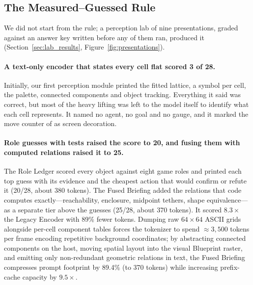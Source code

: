 \subsection{The Measured--Guessed Rule}
\label{sec:rule}

We did not start from the rule; a perception lab of nine presentations, graded against an answer key written before any of them ran, produced it (Section~\ref{sec:lab_results}, Figure~\ref{fig:presentations}).

\paragraph{A text-only encoder that states every cell flat scored 3 of 28.}
Initially, our first perception module printed the fitted lattice, a symbol per cell, the palette, connected components and object tracking. Everything it said was correct, but most of the heavy lifting was left to the model itself to identify what each cell represents. It named no agent, no goal and no gauge, and it marked the move counter of  as screen decoration.

\paragraph{Role guesses with tests raised the score to 20, and fusing them with computed relations raised it to 25.}
The Role Ledger scored every object against eight game roles and printed each top guess with its evidence and the cheapest action that would confirm or refute it (20/28, about 380 tokens). The Fused Briefing added the relations that code computes exactly---reachability, enclosure, midpoint tethers, shape equivalence---as a separate tier above the guesses (25/28, about 370 tokens). It scored $8.3\times$ the Legacy Encoder with 89\% fewer tokens. Dumping raw $64\times 64$ ASCII grids alongside per-cell component tables forces the tokenizer to spend $\approx 3{,}500$ tokens per frame encoding repetitive background coordinates; by abstracting connected components on the host, moving spatial layout into the visual Blueprint raster, and emitting only non-redundant geometric relations in text, the Fused Briefing compresses prompt footprint by 89.4\% (to 370 tokens) while increasing prefix-cache capacity by $9.5\times$.

